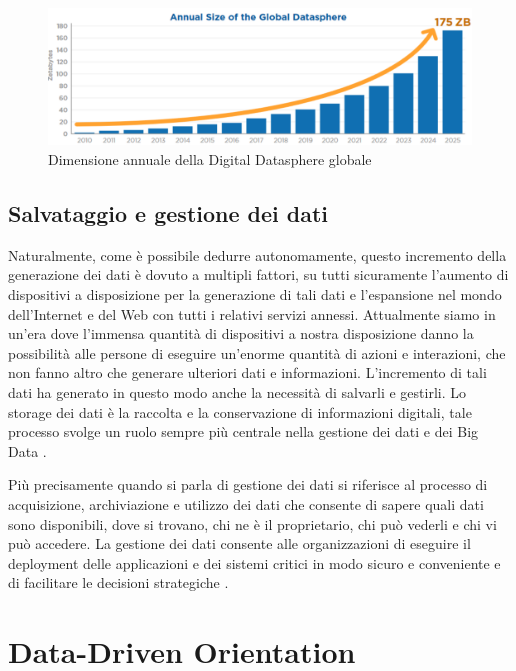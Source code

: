 \begin{figure}[!h]
    \centering
    \includegraphics[width=1\linewidth]{figure/capitolo_1/Annual Size Global Datasphere.pdf}
    \caption{Dimensione annuale della Digital Datasphere globale}
    \label{fig:Annual Size Global Datasphere}
\end{figure}

\subsection{Salvataggio e gestione dei dati}

Naturalmente, come è possibile dedurre autonomamente, questo incremento della generazione dei dati è dovuto a multipli fattori, su tutti sicuramente l'aumento di dispositivi a disposizione per la generazione di tali dati e l'espansione nel mondo dell'Internet e del Web con tutti i relativi servizi annessi. Attualmente siamo in un'era dove l'immensa quantità di dispositivi a nostra disposizione danno la possibilità alle persone di eseguire un'enorme quantità di azioni e interazioni, che non fanno altro che generare ulteriori dati e informazioni. L'incremento di tali dati ha generato in questo modo anche la necessità di salvarli e gestirli. Lo storage dei dati è la raccolta e la conservazione di informazioni digitali, tale processo svolge un ruolo sempre più centrale nella gestione dei dati e dei Big Data \cite{redhat_data_storage}.

Più precisamente quando si parla di gestione dei dati si riferisce al processo di acquisizione, archiviazione e utilizzo dei dati che consente di sapere quali dati sono disponibili, dove si trovano, chi ne è il proprietario, chi può vederli e chi vi può accedere. La gestione dei dati consente alle organizzazioni di eseguire il deployment delle applicazioni e dei sistemi critici in modo sicuro e conveniente e di facilitare le decisioni strategiche \cite{redhat_data_management}.

\section{Data-Driven Orientation}

